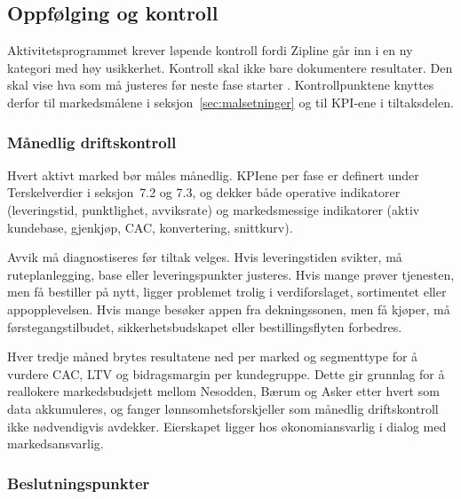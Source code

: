 \subsection{Oppfølging og kontroll}
\label{subsec:oppfolging}

Aktivitetsprogrammet krever løpende kontroll fordi Zipline går inn i en ny
kategori med høy usikkerhet. Kontroll skal ikke bare dokumentere resultater.
Den skal vise hva som må justeres før neste fase starter
\parencite[697]{kotlerkeller2016}. Kontrollpunktene knyttes derfor til
markedsmålene i seksjon~\ref{sec:malsetninger} og til KPI-ene i tiltaksdelen.

\subsubsection{Månedlig driftskontroll}

Hvert aktivt marked bør måles månedlig. KPIene per fase er definert
under Terskelverdier i seksjon~7.2 og 7.3, og dekker både operative
indikatorer (leveringstid, punktlighet, avviksrate) og markedsmessige
indikatorer (aktiv kundebase, gjenkjøp, CAC, konvertering, snittkurv).

Avvik må diagnostiseres før tiltak velges. Hvis leveringstiden svikter,
må ruteplanlegging, base eller leveringspunkter justeres. Hvis mange
prøver tjenesten, men få bestiller på nytt, ligger problemet trolig i
verdiforslaget, sortimentet eller appopplevelsen. Hvis mange besøker
appen fra dekningssonen, men få kjøper, må førstegangstilbudet,
sikkerhetsbudskapet eller bestillingsflyten forbedres.

Hver tredje måned brytes resultatene ned per marked og segmenttype for
å vurdere CAC, LTV og bidragsmargin per kundegruppe. Dette gir grunnlag
for å reallokere markedsbudsjett mellom Nesodden, Bærum og Asker etter
hvert som data akkumuleres, og fanger lønnsomhetsforskjeller som
månedlig driftskontroll ikke nødvendigvis avdekker. Eierskapet ligger
hos økonomiansvarlig i dialog med markedsansvarlig.

\subsubsection{Beslutningspunkter}

